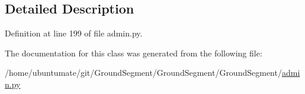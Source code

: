 \subsection{Detailed Description}


Definition at line 199 of file admin.\+py.



The documentation for this class was generated from the following file\+:\begin{DoxyCompactItemize}
\item 
/home/ubuntumate/git/\+Ground\+Segment/\+Ground\+Segment/\+Ground\+Segment/\hyperlink{admin_8py}{admin.\+py}\end{DoxyCompactItemize}
